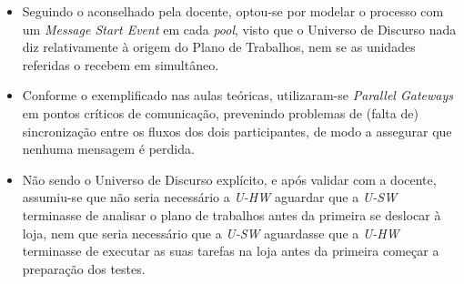 \documentclass[12pt,a4paper]{article}
\begin{document}
\begin{itemize}
	\item Seguindo o aconselhado pela docente, optou-se por modelar o processo com um \emph{Message Start Event} em cada \emph{pool}, visto que o Universo de Discurso nada diz relativamente à origem do Plano de Trabalhos, nem se as unidades referidas o recebem em simultâneo.
	\item Conforme o exemplificado nas aulas teóricas, utilizaram-se \emph{Parallel Gateways} em pontos críticos de comunicação, prevenindo problemas de (falta de) sincronização entre os fluxos dos dois participantes, de modo a assegurar que nenhuma mensagem é perdida.
	\item Não sendo o Universo de Discurso explícito, e após validar com a docente, assumiu-se que não seria necessário a \emph{U-HW} aguardar que a \emph{U-SW} terminasse de analisar o plano de trabalhos antes da primeira se deslocar à loja, nem que seria necessário que a \emph{U-SW} aguardasse que a \emph{U-HW} terminasse de executar as suas tarefas na loja antes da primeira começar a preparação dos testes.
\end{itemize}
\end{document}

